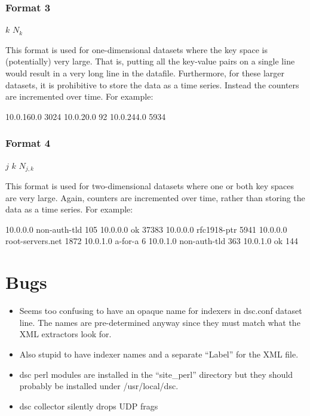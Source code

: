 \documentclass{report}
\def\dsc{{\sc dsc}}
\begin{document}
\subsection{Format 3}

\noindent
\begin{tt}$k$ $N_{k}$
\end{tt}

\vspace{1ex}\noindent
This format is used for one-dimensional datasets where the key space
is (potentially) very large.  That is, putting all the key-value pairs
on a single line would result in a very long line in the datafile.
Furthermore, for these larger datasets, it is prohibitive to
store the data as a time series.  Instead the counters are incremented
over time.  For example:

\begin{MyVerbatim}
10.0.160.0 3024
10.0.20.0 92
10.0.244.0 5934
\end{MyVerbatim}

\subsection{Format 4}

\noindent
\begin{tt}$j$ $k$ $N_{j,k}$
\end{tt}

\vspace{1ex}\noindent
This format is used for two-dimensional datasets where one or both
key spaces are very large.  Again, counters are incremented over
time, rather than storing the data as a time series.
For example:

\begin{MyVerbatim}
10.0.0.0 non-auth-tld 105
10.0.0.0 ok 37383
10.0.0.0 rfc1918-ptr 5941
10.0.0.0 root-servers.net 1872
10.0.1.0 a-for-a 6
10.0.1.0 non-auth-tld 363
10.0.1.0 ok 144
\end{MyVerbatim}

\chapter{Bugs}

\begin{itemize}

\item
	Seems too confusing to have an opaque name for indexers in
	dsc.conf dataset line.  The names are pre-determined anyway
	since they must match what the XML extractors look for.
\item
	Also stupid to have indexer names and a separate ``Label'' for
	the XML file.

\item
	{\dsc} perl modules are installed in the ``site\_perl'' directory
	but they should probably be installed under /usr/local/dsc.

\item
	{\dsc} collector silently drops UDP frags

\end{itemize}
\end{document}
